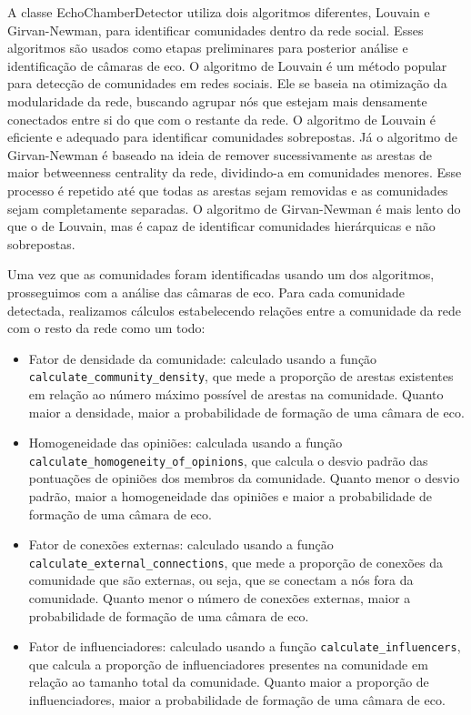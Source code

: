 A classe EchoChamberDetector utiliza dois algoritmos diferentes, Louvain e Girvan-Newman, para identificar comunidades dentro da rede social. Esses algoritmos são usados como etapas preliminares para posterior análise e identificação de câmaras de eco. O algoritmo de Louvain é um método popular para detecção de comunidades em redes sociais. Ele se baseia na otimização da modularidade da rede, buscando agrupar nós que estejam mais densamente conectados entre si do que com o restante da rede. O algoritmo de Louvain é eficiente e adequado para identificar comunidades sobrepostas. Já o algoritmo de Girvan-Newman é baseado na ideia de remover sucessivamente as arestas de maior betweenness centrality da rede, dividindo-a em comunidades menores. Esse processo é repetido até que todas as arestas sejam removidas e as comunidades sejam completamente separadas. O algoritmo de Girvan-Newman é mais lento do que o de Louvain, mas é capaz de identificar comunidades hierárquicas e não sobrepostas.

Uma vez que as comunidades foram identificadas usando um dos algoritmos, prosseguimos com a análise das câmaras de eco. Para cada comunidade detectada, realizamos cálculos estabelecendo relações entre a comunidade da rede com o resto da rede como um todo:

\begin{itemize}
	\item Fator de densidade da comunidade: calculado usando a função \texttt{calculate\_community\_density}, que mede a proporção de arestas existentes em relação ao número máximo possível de arestas na comunidade. Quanto maior a densidade, maior a probabilidade de formação de uma câmara de eco.
	\item Homogeneidade das opiniões: calculada usando a função \texttt{calculate\_homogeneity\_of\_opinions}, que calcula o desvio padrão das pontuações de opiniões dos membros da comunidade. Quanto menor o desvio padrão, maior a homogeneidade das opiniões e maior a probabilidade de formação de uma câmara de eco.
	\item Fator de conexões externas: calculado usando a função \texttt{calculate\_external\_connections}, que mede a proporção de conexões da comunidade que são externas, ou seja, que se conectam a nós fora da comunidade. Quanto menor o número de conexões externas, maior a probabilidade de formação de uma câmara de eco.
	\item Fator de influenciadores: calculado usando a função \texttt{calculate\_influencers}, que calcula a proporção de influenciadores presentes na comunidade em relação ao tamanho total da comunidade. Quanto maior a proporção de influenciadores, maior a probabilidade de formação de uma câmara de eco.
\end{itemize}

